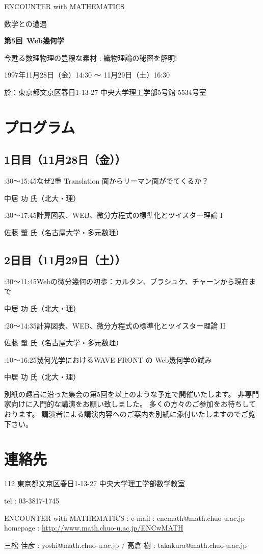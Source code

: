 \documentclass[uplatex,dvipdfmx]{jlreq}
\newcommand{\talk}[3]{%
\noindent
#1\quad #2\par
\hspace*{2em}#3\par\smallskip
}
\newcommand{\EwMnumber}{第5回}
\newcommand{\EwMtitle}{Web幾何学}
\newcommand{\EwMdate}{1997年11月28日（金）14:30 ～ 11月29日（土）16:30}
\newcommand{\EwMplace}{東京都文京区春日1-13-27 中央大学理工学部5号館 5534号室}
\newcommand{\EwMtitleblock}{

\vspace*{-5mm}

\begin{center}

{\Large ENCOUNTER with MATHEMATICS}

\vspace{2mm}

{\large 数学との遭遇}

\vspace{4mm}

{\Large \bfseries \EwMnumber\ \EwMtitle}

\vspace{2mm}

{\large 今甦る数理物理の豊穣な素材 : 織物理論の秘密を解明!}

\vspace{4mm}

\EwMdate

\vspace{2mm}

於：\EwMplace

\end{center}

\vspace{3mm}

\vspace{2mm}

}
\begin{document}
\EwMtitleblock


\section*{プログラム}

\subsection*{1日目（11月28日（金））}

\talk
{14:30～15:45}
{なぜ2重 Translation 面からリーマン面がでてくるか？}
{中居 功 氏（北大・理）}

\talk
{16:30～17:45}
{計算図表、WEB、微分方程式の標準化とツイスター理論 I}
{佐藤 肇 氏（名古屋大学・多元数理）}

\subsection*{2日目（11月29日（土））}

\talk
{10:30～11:45}
{Webの微分幾何の初歩：カルタン、ブラシュケ、チャーンから現在まで}
{中居 功 氏（北大・理）}

\talk
{13:20～14:35}
{計算図表、WEB、微分方程式の標準化とツイスター理論 II}
{佐藤 肇 氏（名古屋大学・多元数理）}

\talk
{15:10～16:25}
{幾何光学におけるWAVE FRONT の Web幾何学の試み}
{中居 功 氏（北大・理）}


\bigskip

別紙の趣旨に沿った集会の第5回を以上のような予定で開催いたします。  
非専門家向けに入門的な講演をお願い致しました。  
多くの方々のご参加をお待ちしております。  
講演者による講演内容へのご案内を別紙に添付いたしますのでご覧下さい。


\section*{連絡先}

112 東京都文京区春日1-13-27 中央大学理工学部数学教室

tel : 03-3817-1745

ENCOUNTER with MATHEMATICS : e-mail : encmath@math.chuo-u.ac.jp  
homepage : \url{http://www.math.chuo-u.ac.jp/ENCwMATH}  

三松 佳彦 : yoshi@math.chuo-u.ac.jp / 高倉 樹 : takakura@math.chuo-u.ac.jp
\end{document}
